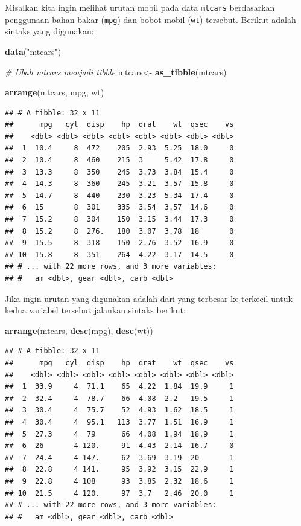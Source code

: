 \documentclass[]{book}
\newenvironment{Shaded}{\begin{snugshade}}{\end{snugshade}}
\newcommand{\KeywordTok}[1]{\textcolor[rgb]{0.13,0.29,0.53}{\textbf{#1}}}
\newcommand{\StringTok}[1]{\textcolor[rgb]{0.31,0.60,0.02}{#1}}
\newcommand{\CommentTok}[1]{\textcolor[rgb]{0.56,0.35,0.01}{\textit{#1}}}
\newcommand{\NormalTok}[1]{#1}
\begin{document}
Misalkan kita ingin melihat urutan mobil pada data \texttt{mtcars}
berdasarkan penggunaan bahan bakar (\texttt{mpg}) dan bobot mobil
(\texttt{wt}) tersebut. Berikut adalah sintaks yang digunakan:

\begin{Shaded}
\begin{Highlighting}[]
\KeywordTok{data}\NormalTok{(}\StringTok{"mtcars"}\NormalTok{)}

\CommentTok{# Ubah mtcars menjadi tibble}
\NormalTok{mtcars<-}\StringTok{ }\KeywordTok{as_tibble}\NormalTok{(mtcars)}

\KeywordTok{arrange}\NormalTok{(mtcars, mpg, wt)}
\end{Highlighting}
\end{Shaded}

\begin{verbatim}
## # A tibble: 32 x 11
##      mpg   cyl  disp    hp  drat    wt  qsec    vs
##    <dbl> <dbl> <dbl> <dbl> <dbl> <dbl> <dbl> <dbl>
##  1  10.4     8  472    205  2.93  5.25  18.0     0
##  2  10.4     8  460    215  3     5.42  17.8     0
##  3  13.3     8  350    245  3.73  3.84  15.4     0
##  4  14.3     8  360    245  3.21  3.57  15.8     0
##  5  14.7     8  440    230  3.23  5.34  17.4     0
##  6  15       8  301    335  3.54  3.57  14.6     0
##  7  15.2     8  304    150  3.15  3.44  17.3     0
##  8  15.2     8  276.   180  3.07  3.78  18       0
##  9  15.5     8  318    150  2.76  3.52  16.9     0
## 10  15.8     8  351    264  4.22  3.17  14.5     0
## # ... with 22 more rows, and 3 more variables:
## #   am <dbl>, gear <dbl>, carb <dbl>
\end{verbatim}

Jika ingin urutan yang digunakan adalah dari yang terbesar ke terkecil
untuk kedua variabel tersebut jalankan sintaks berikut:

\begin{Shaded}
\begin{Highlighting}[]
\KeywordTok{arrange}\NormalTok{(mtcars, }\KeywordTok{desc}\NormalTok{(mpg), }\KeywordTok{desc}\NormalTok{(wt))}
\end{Highlighting}
\end{Shaded}

\begin{verbatim}
## # A tibble: 32 x 11
##      mpg   cyl  disp    hp  drat    wt  qsec    vs
##    <dbl> <dbl> <dbl> <dbl> <dbl> <dbl> <dbl> <dbl>
##  1  33.9     4  71.1    65  4.22  1.84  19.9     1
##  2  32.4     4  78.7    66  4.08  2.2   19.5     1
##  3  30.4     4  75.7    52  4.93  1.62  18.5     1
##  4  30.4     4  95.1   113  3.77  1.51  16.9     1
##  5  27.3     4  79      66  4.08  1.94  18.9     1
##  6  26       4 120.     91  4.43  2.14  16.7     0
##  7  24.4     4 147.     62  3.69  3.19  20       1
##  8  22.8     4 141.     95  3.92  3.15  22.9     1
##  9  22.8     4 108      93  3.85  2.32  18.6     1
## 10  21.5     4 120.     97  3.7   2.46  20.0     1
## # ... with 22 more rows, and 3 more variables:
## #   am <dbl>, gear <dbl>, carb <dbl>
\end{verbatim}
\end{document}
